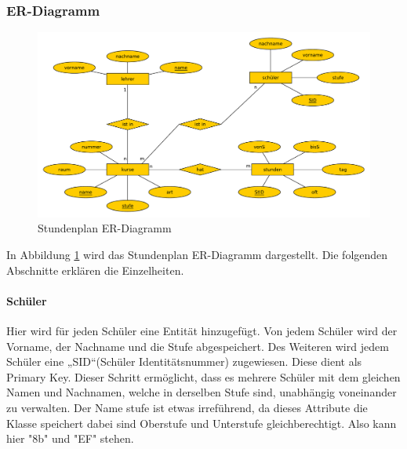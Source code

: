 \documentclass[a4paper, 12pt]{article}
\theoremstyle{plain}
\theoremstyle{definition}
\begin{document}
	\subsubsection{ER-Diagramm}
	\label{sec:ERDia}
	\begin{figure}[h]
	\includegraphics[scale=0.5]{ERStund.pdf}
	\caption{Stundenplan ER-Diagramm}
	\label{fig:ERStund}
	\end{figure}
In Abbildung \ref{fig:ERStund} wird das Stundenplan ER-Diagramm dargestellt. Die folgenden Abschnitte erklären die Einzelheiten.
\paragraph{Schüler}Hier wird für jeden Schüler eine Entität hinzugefügt. Von jedem Schüler wird der Vorname, der Nachname und die Stufe abgespeichert. Des Weiteren wird jedem Schüler eine „SID“(Schüler Identitätsnummer) zugewiesen. Diese dient als Primary Key. Dieser Schritt ermöglicht, dass es mehrere Schüler mit dem gleichen Namen und Nachnamen, welche in derselben Stufe sind, unabhängig voneinander zu verwalten. Der Name stufe ist etwas irreführend, da dieses Attribute die Klasse speichert dabei sind Oberstufe und Unterstufe gleichberechtigt. Also kann hier "8b" und "EF" stehen.

\end{document}
